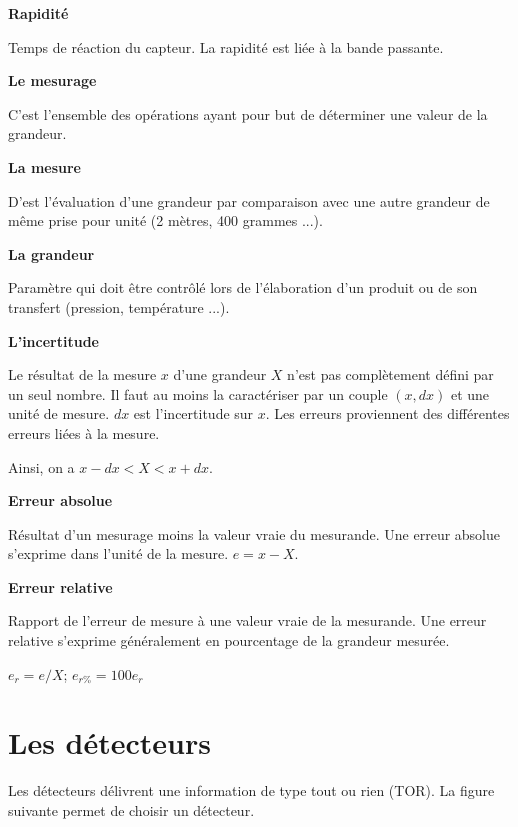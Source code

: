 \documentclass[10pt]{article}
\begin{document}
\begin{defi}
\textbf{Rapidité}

Temps de réaction du capteur. La rapidité est liée à la bande passante.
\end{defi}

\begin{defi}
\textbf{Le mesurage}

C'est l'ensemble des opérations ayant pour but de déterminer une valeur de la grandeur.
\end{defi}

\begin{defi}
\textbf{La mesure}

D'est l'évaluation d'une grandeur par comparaison avec une autre grandeur de même prise pour unité (2 mètres, 400 grammes ...).
\end{defi}

\begin{defi}
\textbf{La grandeur}

Paramètre qui doit être contrôlé lors de l'élaboration d'un produit ou de son transfert (pression, température ...). 
\end{defi}

\begin{defi}
\textbf{L'incertitude}

Le résultat de la mesure $x$ d'une grandeur $X$ n'est pas complètement défini par un seul nombre. Il faut au moins la caractériser par un couple $(x,dx)$ et une unité de mesure. $dx$ est l'incertitude sur $x$. Les erreurs proviennent des différentes erreurs liées à la mesure. 

Ainsi, on a $x-dx<X<x+dx$.
\end{defi}

\begin{defi}
\textbf{Erreur absolue}

Résultat d'un mesurage moins la valeur vraie du mesurande. Une erreur absolue s'exprime dans l'unité de la mesure. $e=x-X$.  
\end{defi}


\begin{defi}
\textbf{Erreur relative}

Rapport de l'erreur de mesure à une valeur vraie de la mesurande. Une erreur relative s'exprime généralement en pourcentage de la grandeur mesurée. 


$e_r=e/X$; $e_{r\%}=100 e_r$
\end{defi}



\section{Les détecteurs}
Les détecteurs délivrent une information de type tout ou rien (TOR). La figure suivante permet de choisir un détecteur.
\end{document}
